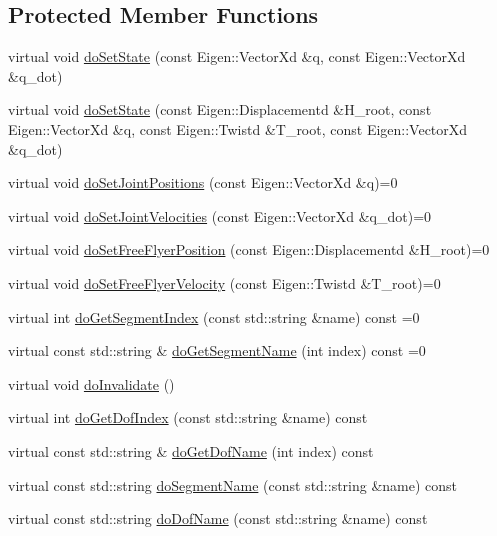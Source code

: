 \subsection*{Protected Member Functions}
\begin{DoxyCompactItemize}
\item 
virtual void \hyperlink{classocra_1_1Model_a3281cf832fe0e60fc087acda97064bb2}{do\+Set\+State} (const Eigen\+::\+Vector\+Xd \&q, const Eigen\+::\+Vector\+Xd \&q\+\_\+dot)
\item 
virtual void \hyperlink{classocra_1_1Model_adab6b86806c9298ecba14da065badacf}{do\+Set\+State} (const Eigen\+::\+Displacementd \&H\+\_\+root, const Eigen\+::\+Vector\+Xd \&q, const Eigen\+::\+Twistd \&T\+\_\+root, const Eigen\+::\+Vector\+Xd \&q\+\_\+dot)
\item 
virtual void \hyperlink{classocra_1_1Model_a1353dd716f80843ea11ff6193c512b13}{do\+Set\+Joint\+Positions} (const Eigen\+::\+Vector\+Xd \&q)=0
\item 
virtual void \hyperlink{classocra_1_1Model_a770a539312a2e805fcca2af3529ecff9}{do\+Set\+Joint\+Velocities} (const Eigen\+::\+Vector\+Xd \&q\+\_\+dot)=0
\item 
virtual void \hyperlink{classocra_1_1Model_a4174e9fd30f913f43e516bbef9583ca2}{do\+Set\+Free\+Flyer\+Position} (const Eigen\+::\+Displacementd \&H\+\_\+root)=0
\item 
virtual void \hyperlink{classocra_1_1Model_aad824e82f724f24e3769c74355162bda}{do\+Set\+Free\+Flyer\+Velocity} (const Eigen\+::\+Twistd \&T\+\_\+root)=0
\item 
virtual int \hyperlink{classocra_1_1Model_aede6166f1991c23db634aa5ff16b6584}{do\+Get\+Segment\+Index} (const std\+::string \&name) const =0
\item 
virtual const std\+::string \& \hyperlink{classocra_1_1Model_a0f339ce01a0871a19b0f952bdda82822}{do\+Get\+Segment\+Name} (int index) const =0
\item 
virtual void \hyperlink{classocra_1_1Model_a902663196e1c7535c27b755cf4436693}{do\+Invalidate} ()
\item 
virtual int \hyperlink{classocra_1_1Model_a4d8c2a94b1f4c2ea936abd4000dc5863}{do\+Get\+Dof\+Index} (const std\+::string \&name) const 
\item 
virtual const std\+::string \& \hyperlink{classocra_1_1Model_a5b875580a6c72a69d1f7a365a8e82ec2}{do\+Get\+Dof\+Name} (int index) const 
\item 
virtual const std\+::string \hyperlink{classocra_1_1Model_a1f2662950827213b983c6104b9e4ec52}{do\+Segment\+Name} (const std\+::string \&name) const 
\item 
virtual const std\+::string \hyperlink{classocra_1_1Model_a80f680536f13c8d0db0279109741c6cb}{do\+Dof\+Name} (const std\+::string \&name) const 
\end{DoxyCompactItemize}
